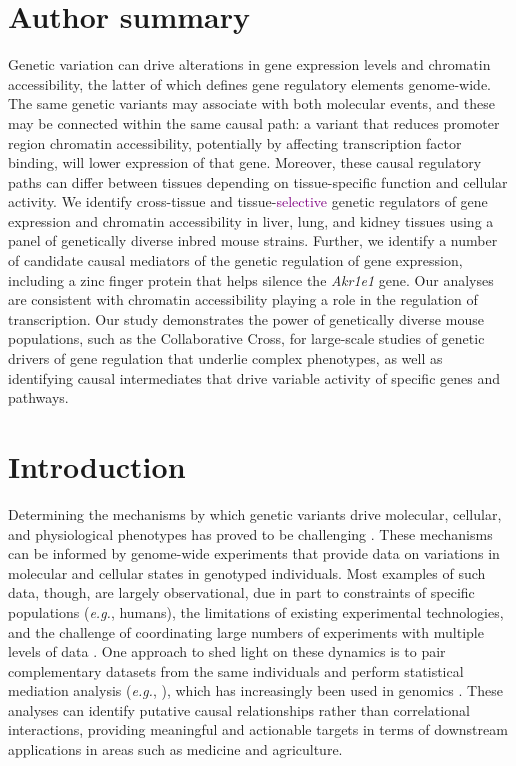 \documentclass[10pt,letterpaper]{article}
\newcommand{\eg}{\emph{e.g.}\xspace}
\newcommand{\TFinline}[1]{\textcolor{purple}{#1}}
\begin{document}
\section*{Author summary}
Genetic variation can drive alterations in gene expression levels and chromatin accessibility, the latter of which defines gene regulatory elements genome-wide. The same genetic variants may associate with both molecular events, and these may be connected within the same causal path: a variant that reduces promoter region chromatin accessibility, potentially by affecting transcription factor binding,  will lower expression of that gene. Moreover, these causal regulatory paths can differ between tissues depending on tissue-specific function and cellular activity. We identify cross-tissue and tissue-\TFinline{selective} genetic regulators of gene expression and chromatin accessibility in liver, lung, and kidney tissues using a panel of genetically diverse inbred mouse strains. Further, we identify a number of candidate causal mediators of the genetic regulation of gene expression, including a zinc finger protein that helps silence the \textit{Akr1e1} gene. Our analyses are consistent with chromatin accessibility playing a role in the regulation of transcription. Our study demonstrates the power of genetically diverse mouse populations, such as the Collaborative Cross, for large-scale studies of genetic drivers of gene regulation that underlie complex phenotypes, as well as identifying causal intermediates that drive variable activity of specific genes and pathways.

\linenumbers

\section*{Introduction}
Determining the mechanisms by which genetic variants drive molecular, cellular, and physiological phenotypes has proved to be challenging \cite{Schadt2009}. These mechanisms can be informed by genome-wide experiments that provide data on variations in molecular and cellular states in genotyped individuals. Most examples of such data, though, are largely observational, due in part to constraints of specific populations (\eg, humans), the limitations of existing experimental technologies, and the challenge of coordinating large numbers of experiments with multiple levels of data \cite{Schaid2018}. 
One approach to shed light on these dynamics is to pair complementary datasets from the same individuals and perform statistical mediation analysis (\eg, \cite{Baron1986, Mackinnon2007}), which has increasingly been used in genomics \cite{Richmond2016}. These analyses can identify putative causal relationships rather than correlational interactions, providing meaningful and actionable targets in terms of downstream applications in areas such as medicine and agriculture.
\end{document}
